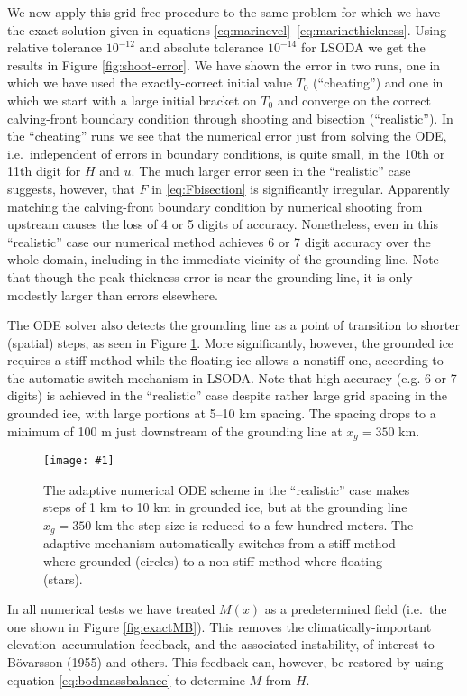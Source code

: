 \documentclass[twocolumn]{igs}
\renewcommand{\dh}{\fontencoding{T1}\selectfont{\symbol{240}}}
\newcommand{\onecol}[1]{\texttt{[image: \#1]}}
\newcommand{\citebod}{B\"o\dh varsson (1955)\nocite{Bodvardsson}\xspace}
\begin{document}
We now apply this grid-free procedure to the same problem for which we have the exact solution given in equations \eqref{eq:marinevel}--\eqref{eq:marinethickness}.  Using relative tolerance $10^{-12}$ and absolute tolerance $10^{-14}$ for LSODA we get the results in Figure \ref{fig:shoot-error}.  We have shown the error in two runs, one in which we have used the exactly-correct initial value $T_0$ (``cheating'') and one in which we start with a large initial bracket on $T_0$ and converge on the correct calving-front boundary condition through shooting and bisection (``realistic'').  In the ``cheating'' runs we see that the numerical error just from solving the ODE, i.e.~independent of errors in boundary conditions, is quite small, in the 10th or 11th digit for $H$ and $u$.  The much larger error seen in the ``realistic'' case suggests, however, that $F$ in \eqref{eq:Fbisection} is significantly irregular.  Apparently matching the calving-front boundary condition by numerical shooting from upstream causes the loss of 4 or 5 digits of accuracy.  Nonetheless, even in this ``realistic'' case our numerical method achieves 6 or 7 digit accuracy over the whole domain, including in the immediate vicinity of the grounding line.  Note that though the peak thickness error is near the grounding line, it is only modestly larger than errors elsewhere.

The ODE solver also detects the grounding line as a point of transition to shorter (spatial) steps, as seen in Figure \ref{fig:shoot-dt-adaptive}.  More significantly, however, the grounded ice requires a stiff method while the floating ice allows a nonstiff one, according to the automatic switch mechanism in LSODA.  Note that high accuracy (e.g. 6 or 7 digits) is achieved in the ``realistic'' case despite rather large grid spacing in the grounded ice, with large portions at 5--10 km spacing.  The spacing drops to a minimum of 100 m just downstream of the grounding line at $x_g=350$ km.

\begin{figure}[ht]
\onecol{em-dt-adaptive}
\caption{The adaptive numerical ODE scheme in the ``realistic'' case makes steps of 1 km to 10 km in grounded ice, but at the grounding line $x_g=350$ km the step size is reduced to a few hundred meters.  The adaptive mechanism automatically switches from a stiff method where grounded (circles) to a non-stiff method where floating (stars).} \label{fig:shoot-dt-adaptive}
\end{figure}

In all numerical tests we have treated $M(x)$ as a predetermined field (i.e.~the one shown in Figure \ref{fig:exactMB}).  This removes the climatically-important elevation--accumulation feedback, and the associated instability, of interest to \citebod and others.  This feedback can, however, be restored by using equation \eqref{eq:bodmassbalance} to determine $M$ from $H$.
\end{document}
